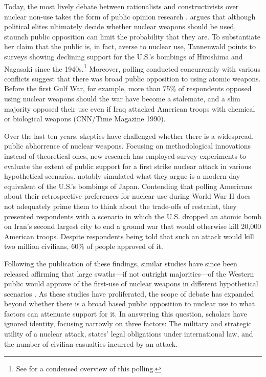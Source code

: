 \documentclass[12pt]{article}
\begin{document}
Today, the most lively debate between rationalists and constructivists over nuclear non-use takes the form of public opinion research \citep{smetana_forum_2021}. \citet{tannenwald_nuclear_2007} argues that although political elites ultimately decide whether nuclear weapons should be used, staunch public opposition can limit the probability that they are. To substantiate her claim that the public is, in fact, averse to nuclear use, Tannenwald points to surveys showing declining support for the U.S.'s bombings of Hiroshima and Nagasaki since the 1940s.\footnote{See \citet{sagan_revisiting_2017} for a condensed overview of this polling.} Moreover, polling conducted concurrently with various conflicts suggest that there was broad public opposition to using atomic weapons. Before the first Gulf War, for example, more than 75\% of respondents opposed using nuclear weapons should the war have become a stalemate, and a slim majority opposed their use even if Iraq attacked American troops with chemical or biological weapons (CNN/Time Magazine 1990). 

Over the last ten years, skeptics have challenged whether there is a widespread, public abhorrence of nuclear weapons. Focusing on methodological innovations instead of theoretical ones, new research has employed survey experiments to evaluate the extent of public support for a first strike nuclear attack in various hypothetical scenarios. \citet{sagan_revisiting_2017} notably simulated what they argue is a modern-day equivalent of the U.S.'s bombings of Japan. Contending that polling Americans about their retrospective preferences for nuclear use during World War II does not adequately prime them to think about the trade-offs of restraint, they presented respondents with a scenario in which the U.S. dropped an atomic bomb on Iran's second largest city to end a ground war that would otherwise kill 20,000 American troops. Despite respondents being told that such an attack would kill two million civilians, 60\% of people approved of it.

Following the publication of these findings, similar studies have since been released affirming that large swaths—if not outright majorities—of the Western public would approve of the first-use of nuclear weapons in different hypothetical scenarios \citep{aronow_note_2019,haworth_what_2019, dill_kettles_2022,schwartz_when_2024}. As these studies have proliferated, the scope of debate has expanded beyond whether there is a broad based public opposition to nuclear use to what factors can attenuate support for it. In answering this question, scholars have ignored identity, focusing narrowly on three factors: The military and strategic utility of a nuclear attack, states' legal obligations under international law, and the number of civilian casualties incurred by an attack.
\end{document}

